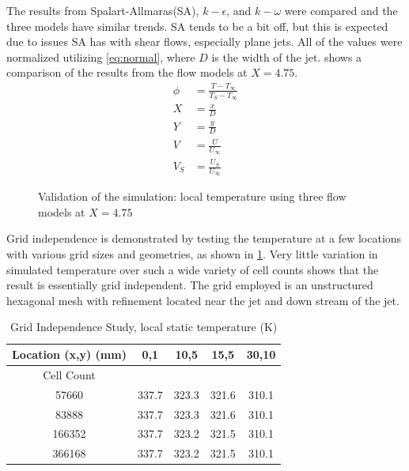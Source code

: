 \documentclass[preprint,12pt]{elsarticle}
\begin{document}
The results from Spalart-Allmaras(SA), $k-\epsilon$, and $k-\omega$ were compared and the three models have similar trends.  SA tends to be a bit off, but this is expected due to issues SA has with shear flows, especially plane jets\cite{fluent}.  All of the values were normalized utilizing \cref{eq:normal}, where $D$ is the width of the jet.   shows a comparison of the results from the flow models at $X=4.75$.
\begin{subequations}
\begin{align}
\phi &= \frac{T-T_{\infty}}{T_S-T_{\infty}} \\
X &= \frac{x}{D} \\
Y &= \frac{y}{D} \\
V &= \frac{U}{U_\infty}  \\
V_S &= \frac{U_S}{U_{\infty}}
\end{align}
\label{eq:normal}
\end{subequations}
\begin{figure}[!tbp]
	\centering
  \setlength\figureheight{5cm} 
	\setlength\figurewidth{5cm}
	
	\caption{Validation of the simulation: local temperature using three flow models at $X=4.75$}
	\label{fig:jetmodel15mm}
\end{figure}

Grid independence is demonstrated by testing the temperature at a few locations with various grid sizes and geometries, as shown in \cref{tab:gridjet}.  Very little variation in simulated temperature over such a wide variety of cell counts shows that the result is essentially grid independent.  The grid employed is an unstructured hexagonal mesh with refinement located near the jet and down stream of the jet.
\begin{table}[!t!b!p]
\begin{center}
\begin{tabular}{ c c c c c }
\hline
 Location (x,y) (mm) & 0,1 & 10,5 & 15,5& 30,10 \\ \hline \hline
 Cell Count & \\ \hline
 57660  & 337.7 & 323.3 & 321.6 & 310.1 \\ \hline
 83888  & 337.7 & 323.3 & 321.6 & 310.1 \\ \hline
 166352 & 337.7 & 323.2 & 321.5 & 310.1 \\ \hline
 366168 & 337.7 & 323.2 & 321.5 & 310.1 \\ \hline
\end{tabular}
\caption{Grid Independence Study, local static temperature (K)}
\label{tab:gridjet}
\end{center}
\end{table}
\end{document}
